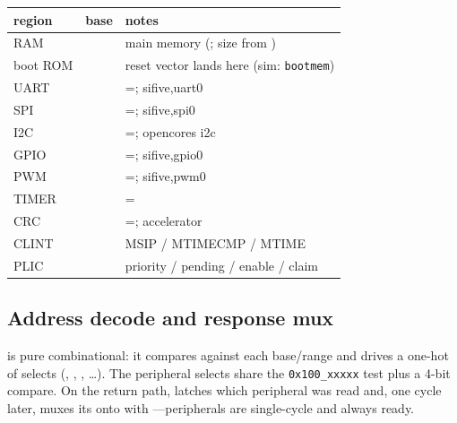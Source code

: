 \begin{center}\small
\begin{tabularx}{\textwidth}{l l Y}
\toprule
\textbf{region} & \textbf{base} & \textbf{notes}\\\midrule
RAM        &  & main memory (; size from )\\
boot ROM   &  & reset vector lands here (sim: \texttt{bootmem})\\
UART       &  & =; sifive,uart0\\
SPI        &  & =; sifive,spi0\\
I2C        &  & =; opencores i2c\\
GPIO       &  & =; sifive,gpio0\\
PWM        &  & =; sifive,pwm0\\
TIMER      &  & =\\
CRC        &  & =; accelerator\\
CLINT      &  & MSIP / MTIMECMP / MTIME\\
PLIC       &  & priority / pending / enable / claim\\
\bottomrule
\end{tabularx}
\end{center}

\subsection{Address decode and response mux}
 is pure combinational: it compares  against each
base/range and drives a one-hot of selects (, ,
, \dots). The peripheral selects share the
\texttt{0x100\_xxxxx} test plus a 4-bit  compare. On the return
path,  latches which peripheral was read and, one cycle later,
muxes its  onto  with ---peripherals are
single-cycle and always ready.

